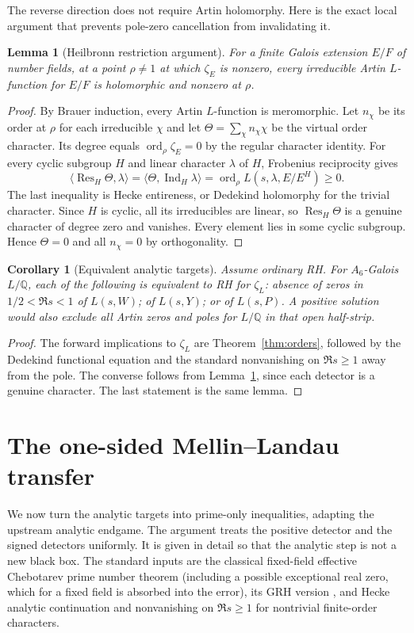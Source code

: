 \documentclass[11pt,letterpaper]{article}
\newtheorem{lemma}[theorem]{Lemma}
\newtheorem{corollary}[theorem]{Corollary}
\theoremstyle{remark}\newtheorem{remark}[theorem]{Remark}
\newcommand{\Q}{\mathbb Q}\newcommand{\C}{\mathbb C}\newcommand{\R}{\mathbb R}
\newcommand{\Ind}{\operatorname{Ind}}\newcommand{\Res}{\operatorname{Res}}\newcommand{\ord}{\operatorname{ord}}\newcommand{\reg}{\operatorname{reg}}\newcommand{\Gal}{\operatorname{Gal}}\newcommand{\Frob}{\operatorname{Frob}}\newcommand{\one}{\mathbf1}\newcommand{\RH}{\mathrm{RH}}
\begin{document}
The reverse direction does not require Artin holomorphy. Here is the exact local argument that prevents pole-zero cancellation from invalidating it.
\begin{lemma}[Heilbronn restriction argument]\label{lem:heilbronn}
For a finite Galois extension $E/F$ of number fields, at a point $\rho\ne1$ at which $\zeta_E$ is nonzero, every irreducible Artin $L$-function for $E/F$ is holomorphic and nonzero at $\rho$.
\end{lemma}
\begin{proof}
By Brauer induction, every Artin $L$-function is meromorphic. Let $n_\chi$ be its order at $\rho$ for each irreducible $\chi$ and let $\Theta=\sum_\chi n_\chi\chi$ be the virtual order character. Its degree equals $\ord_\rho\zeta_E=0$ by the regular character identity. For every cyclic subgroup $H$ and linear character $\lambda$ of $H$, Frobenius reciprocity gives
\[
 \langle\Res_H\Theta,\lambda\rangle=\langle\Theta,\Ind_H\lambda\rangle
   =\ord_\rho L(s,\lambda,E/E^H)\ge0.
\]
The last inequality is Hecke entireness, or Dedekind holomorphy for the trivial character. Since $H$ is cyclic, all its irreducibles are linear, so $\Res_H\Theta$ is a genuine character of degree zero and vanishes. Every element lies in some cyclic subgroup. Hence $\Theta=0$ and all $n_\chi=0$ by orthogonality.
\end{proof}

\begin{corollary}[Equivalent analytic targets]\label{cor:targets}
Assume ordinary RH. For $A_6$-Galois $L/\Q$, each of the following is equivalent to RH for $\zeta_L$: absence of zeros in $1/2<\Re s<1$ of $L(s,W)$; of $L(s,Y)$; or of $L(s,P)$. A positive solution would also exclude all Artin zeros and poles for $L/\Q$ in that open half-strip.
\end{corollary}
\begin{proof}
The forward implications to $\zeta_L$ are Theorem~\ref{thm:orders}, followed by the Dedekind functional equation and the standard nonvanishing on $\Re s\ge1$ away from the pole. The converse follows from Lemma~\ref{lem:heilbronn}, since each detector is a genuine character. The last statement is the same lemma.
\end{proof}

\section{The one-sided Mellin--Landau transfer}\label{sec:analytic}
We now turn the analytic targets into prime-only inequalities, adapting the upstream analytic endgame. The argument treats the positive detector and the signed detectors uniformly. It is given in detail so that the analytic step is not a new black box. The standard inputs are the classical fixed-field effective Chebotarev prime number theorem (including a possible exceptional real zero, which for a fixed field is absorbed into the error), its GRH version \cite{lo}, and Hecke analytic continuation and nonvanishing on $\Re s\ge1$ for nontrivial finite-order characters.
\end{document}
